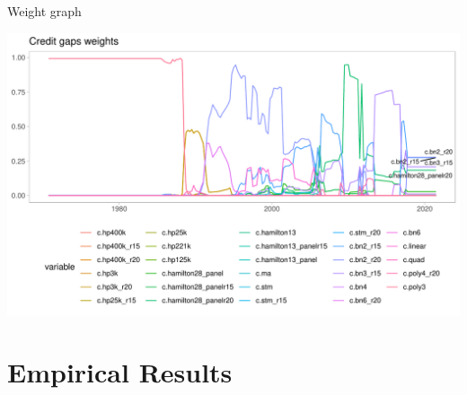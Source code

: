 \documentclass[
  ignorenonframetext,
]{beamer}
\begin{document}
\begin{frame}{Weight graph}
\protect\hypertarget{weight-graph}{}
\begin{center}\includegraphics[width=1\linewidth]{../Data/Output/Graphs/Weights_series} \end{center}
\end{frame}

\hypertarget{empirical-results}{%
\section{Empirical Results}\label{empirical-results}}
\end{document}
